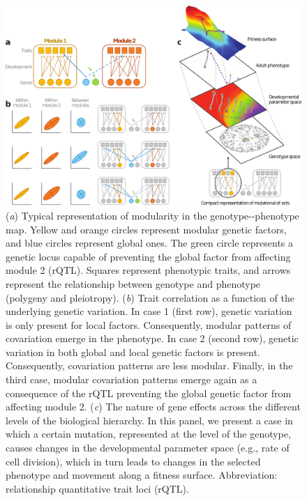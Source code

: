 \begin{refsection}
\begin{figure}
\includegraphics[width=\linewidth]{chapter_annual_review/media/figure1.png}
\caption[Genetic variation in modularity]{(\emph{a}) Typical representation
of modularity in the genotype-\/-phenotype map. Yellow and orange
circles represent modular genetic factors, and blue circles represent
global ones. The green circle represents a genetic locus capable of
preventing the global factor from affecting module 2 (rQTL). Squares
represent phenotypic traits, and arrows represent the relationship
between genotype and phenotype (polygeny and pleiotropy). (\emph{b})
Trait correlation as a function of the underlying genetic variation. In
case 1 (first row), genetic variation is only present for local factors.
Consequently, modular patterns of covariation emerge in the phenotype.
In case 2 (second row), genetic variation in both global and local
genetic factors is present. Consequently, covariation patterns are less
modular. Finally, in the third case, modular covariation patterns emerge
again as a consequence of the rQTL preventing the global genetic factor
from affecting module 2. (\emph{c}) The nature of gene effects across
the different levels of the biological hierarchy. In this panel, we
present a case in which a certain mutation, represented at the level of
the genotype, causes changes in the developmental parameter space (e.g.,
rate of cell division), which in turn leads to changes in the selected
phenotype and movement along a fitness surface. Abbreviation:
relationship quantitative trait loci (rQTL).}
\label{aree:fig1}
\end{figure}


\end{refsection}

